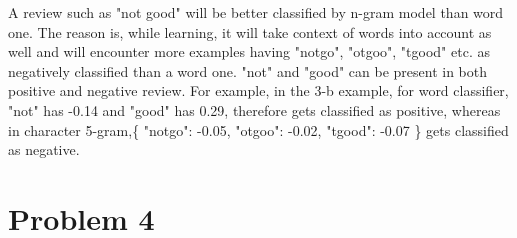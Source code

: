 \documentclass[12pt]{article}
\begin{document}
\begin{enumerate}[label=(\alph*)]
	A review such as "not good" will be better classified by n-gram model than word one. The reason is, while learning, it will take context of words into account as well and will encounter more examples having "notgo", "otgoo", "tgood" etc. as negatively classified than a word one. "not" and "good" can be present in both positive and negative review. For example, in the 3-b example, for word classifier, "not" has -0.14 and "good" has 0.29, therefore gets classified as positive, whereas in character 5-gram,\{ "notgo": -0.05, "otgoo": -0.02, "tgood": -0.07 \} gets classified as negative. 


\end{enumerate}

\section*{Problem 4}
\end{document}
